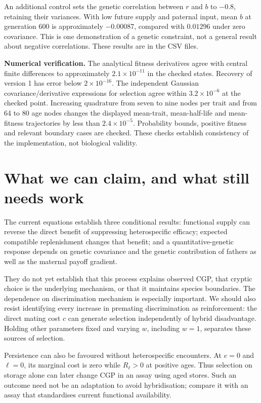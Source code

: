\documentclass[11pt,a4paper]{article}
\begin{document}
An additional control sets the genetic correlation between $r$ and $b$ to $-0.8$, retaining their variances. With low future supply and paternal input, mean $b$ at generation 600 is approximately $-0.00087$, compared with $0.01296$ under zero covariance. This is one demonstration of a genetic constraint, not a general result about negative correlations. These results are in the CSV files.

\textbf{Numerical verification.} The analytical fitness derivatives agree with central finite differences to approximately $2.1\times10^{-11}$ in the checked states. Recovery of version 1 has error below $2\times10^{-16}$. The independent Gaussian covariance/derivative expressions for selection agree within $3.2\times10^{-6}$ at the checked point. Increasing quadrature from seven to nine nodes per trait and from 64 to 80 age nodes changes the displayed mean-trait, mean-half-life and mean-fitness trajectories by less than $2.4\times10^{-5}$. Probability bounds, positive fitness and relevant boundary cases are checked. These checks establish consistency of the implementation, not biological validity.

\section{What we can claim, and what still needs work}
The current equations establish three conditional results: functional supply can reverse the direct benefit of suppressing heterospecific efficacy; expected compatible replenishment changes that benefit; and a quantitative-genetic response depends on genetic covariance and the genetic contribution of fathers as well as the maternal payoff gradient.

They do not yet establish that this process explains observed CGP, that cryptic choice is the underlying mechanism, or that it maintains species boundaries. The dependence on discrimination mechanism is especially important. We should also resist identifying every increase in premating discrimination as reinforcement: the direct mating cost $c$ can generate selection independently of hybrid disadvantage. Holding other parameters fixed and varying $w$, including $w=1$, separates these sources of selection.

Persistence can also be favoured without heterospecific encounters. At $e=0$ and $\ell=0$, its marginal cost is zero while $R_\ell>0$ at positive ages. Thus selection on storage alone can later change CGP in an assay using aged stores. Such an outcome need not be an adaptation to avoid hybridisation; compare it with an assay that standardises current functional availability.
\end{document}
